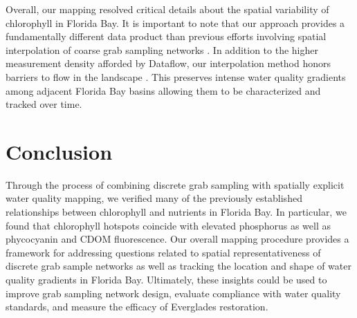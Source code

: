 Overall, our mapping resolved critical details about the spatial variability of chlorophyll in Florida Bay. It is important to note that our approach provides a fundamentally different data product than previous efforts involving spatial interpolation of coarse grab sampling networks \cite{fourqurean1993process}. In addition to the higher measurement density afforded by Dataflow, our interpolation method honors barriers to flow in the landscape \cite{stachelek_application_2015}. This preserves intense water quality gradients among adjacent Florida Bay basins allowing them to be characterized and tracked over time.
	
\section{Conclusion}
\label{conclusion}

	Through the process of combining discrete grab sampling with spatially explicit water quality mapping, we verified many of the previously established relationships between chlorophyll and nutrients in Florida Bay. In particular, we found that chlorophyll hotspots coincide with elevated phosphorus as well as phycocyanin and CDOM fluorescence. Our overall mapping procedure provides a framework for addressing questions related to spatial representativeness of discrete grab sample networks as well as tracking the location and shape of water quality gradients in Florida Bay. Ultimately, these insights could be used to improve grab sampling network design, evaluate compliance with water quality standards, and measure the efficacy of Everglades restoration.


